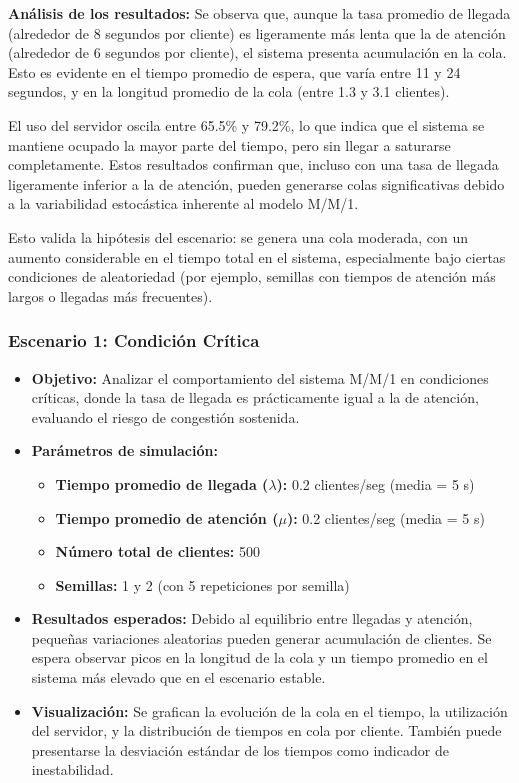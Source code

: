 \documentclass{article}
\begin{document}
\textbf{Análisis de los resultados:}  
Se observa que, aunque la tasa promedio de llegada (alrededor de 8 segundos por cliente) es ligeramente más lenta que la de atención (alrededor de 6 segundos por cliente), el sistema presenta acumulación en la cola. Esto es evidente en el tiempo promedio de espera, que varía entre 11 y 24 segundos, y en la longitud promedio de la cola (entre 1.3 y 3.1 clientes).  

El uso del servidor oscila entre 65.5\% y 79.2\%, lo que indica que el sistema se mantiene ocupado la mayor parte del tiempo, pero sin llegar a saturarse completamente. Estos resultados confirman que, incluso con una tasa de llegada ligeramente inferior a la de atención, pueden generarse colas significativas debido a la variabilidad estocástica inherente al modelo M/M/1.  

Esto valida la hipótesis del escenario: se genera una cola moderada, con un aumento considerable en el tiempo total en el sistema, especialmente bajo ciertas condiciones de aleatoriedad (por ejemplo, semillas con tiempos de atención más largos o llegadas más frecuentes).

\subsubsection{Escenario 1: Condición Crítica}

\begin{itemize}
    \item \textbf{Objetivo:} Analizar el comportamiento del sistema M/M/1 en condiciones críticas, donde la tasa de llegada es prácticamente igual a la de atención, evaluando el riesgo de congestión sostenida.

    \item \textbf{Parámetros de simulación:}
    \begin{itemize}
        \item \textbf{Tiempo promedio de llegada ($\lambda$):} 0.2 clientes/seg (media = 5 s)
        \item \textbf{Tiempo promedio de atención ($\mu$):} 0.2 clientes/seg (media = 5 s)
        \item \textbf{Número total de clientes:} 500
        \item \textbf{Semillas:} 1 y 2 (con 5 repeticiones por semilla)
    \end{itemize}

    \item \textbf{Resultados esperados:} 
    Debido al equilibrio entre llegadas y atención, pequeñas variaciones aleatorias pueden generar acumulación de clientes. Se espera observar picos en la longitud de la cola y un tiempo promedio en el sistema más elevado que en el escenario estable.

    \item \textbf{Visualización:} 
    Se grafican la evolución de la cola en el tiempo, la utilización del servidor, y la distribución de tiempos en cola por cliente. También puede presentarse la desviación estándar de los tiempos como indicador de inestabilidad.

\end{itemize}
\end{document}
